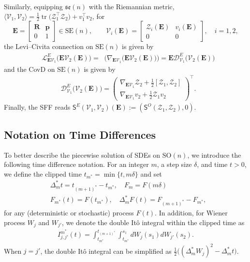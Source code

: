 \documentclass[11pt, a4paper, onecolumn]{article}
\newcommand{\SOn}{\mathrm{SO}(n)}
\newcommand{\SEn}{\mathrm{SE}(n)}
\newcommand{\sen}{\mathfrak{se}(n)}
\newcommand{\E}{\mathbb{E}}
\newcommand{\bfE}{\bf{E}}
\newcommand{\LE}{\tg L^{E}}
\newcommand{\DE}{\tg D^{E}}
\newcommand{\SSO}{\nm S^{O}}
\newcommand{\SSE}{\nm S^{E}}
\newcommand{\Z}{\mathcal{Z}}
\renewcommand{\bf}[1]{\mathbf{#1}}
\newcommand{\tg}[1]{\mathcal{#1}}
\newcommand{\nm}[1]{\mathsf{#1}}
\newcommand{\ms}{{m^*}}
\newcommand{\mos}{{(m+1)^*}}
\newcommand{\Dms}{{\Delta^{*}_{m}}}
\newcommand{\Ijjpms}{ {I_{j,j'}^{\ms}} }
\newcommand{\half}{{\frac{1}{2}}}
\DeclareMathOperator{\PEtg}{\Pi^E_{T_{\E}}}
\newcommand{\Der}[4]{
  #1_{#2}\bigl(#3(#4)\bigr)
}
\begin{document}
Similarly, equipping $\sen$ with the Riemannian metric,$ \langle\tg V_1,\tg V_2\rangle = \half\operatorname{tr}\bigl(\Z_1^{\top}\Z_2\bigr) + v_1^{\top} v_2$, for
\[
\bfE=
\begin{bmatrix}\bf R & \bf p \\ 
0 & 1\end{bmatrix}\in\SEn,
\qquad
\tg V_i(\bfE)=
\begin{bmatrix}
   \tg Z_i(\bfE) & v_i(\bfE)\\
    0 & 0
\end{bmatrix},
\quad i=1,2,
\]
the Levi–Civita connection on $\SEn$ is given by
\begin{align*}
   &\Der{\LE}{\bfE\tg V_1}{\bfE\tg V_2}{\bfE} =  \PEtg \bigl( \Der{\nabla}{\bfE\tg V_1}{\bfE\tg V_2}{\bfE} \bigr) =  \bfE \Der{\DE}{\tg V_1}{\tg V_2}{\bfE} 
\end{align*}
and the CovD on $\SEn$ is given by
\begin{align}\label{eq:LC-SE}
   & \Der{\DE}{\tg V_1}{\tg V_2}{\bfE} =
   \begin{pmatrix}
        \nabla_{\bfE\tg V_1}\tg Z_2 +\tfrac12[\tg Z_1,\tg Z_2] \\
        \nabla_{\bfE\tg V_1}v_2 + \tfrac12 \tg Z_1v_2
   \end{pmatrix}^{\top}. 
\end{align}
Finally, the SFF reads $\SSE(\tg V_1,\tg V_2)(\bfE):= (\SSO(\Z_1,\Z_2),0)$. 


\subsection{Notation on Time Differences}

To better describe the piecewise solution of SDEs on $\SOn$, we introduce the following time difference notation. For an integer $ m $, a step size $ \delta $, and time $ t>0 $, we define the clipped time $ t_{\ms} = \min\{t, m\delta\} $ and set
\begin{align*}
 & \Dms t = t_{\mos} - t_{\ms}, \quad F_m = F(m\delta) \\ 
 & F_{\ms}(t) = F(t_\ms), \quad \Dms F(t) = F_{\mos} - F_{\ms},
\end{align*}
for any  (deterministic or stochastic) process $F(t)$. In addition, for Wiener process $W_j$ and $W_{j'}$, we denote the double It\^o integral within the clipped time as
\begin{align*}
   \Ijjpms(t) = \int_{t_\ms}^{t_\mos} \int_{t_\ms}^{s_1}dW_{j}(s_1) dW_{j'}(s_2).
\end{align*}
When $j = j'$, the double It\^o integral can be simplified as $\half\big((\Dms W_j)^2-\Dms t\big)$.
\end{document}
